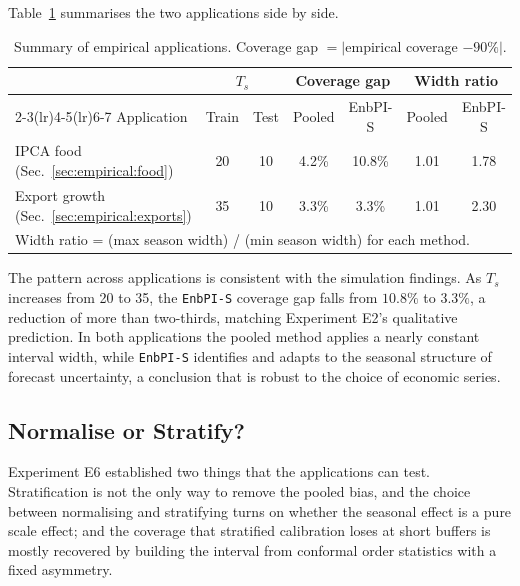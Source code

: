 Table~\ref{tab:empirical_comparison} summarises the two applications
side by side.

\begin{table}[ht]
\centering
\caption{Summary of empirical applications.
         Coverage gap $= |$empirical coverage $- 90\%|$.}
\label{tab:empirical_comparison}
\begin{tabular}{l cc cc cc}
\toprule
 & \multicolumn{2}{c}{$T_s$} &
   \multicolumn{2}{c}{Coverage gap} &
   \multicolumn{2}{c}{Width ratio} \\
\cmidrule(lr){2-3}\cmidrule(lr){4-5}\cmidrule(lr){6-7}
Application & Train & Test &
  Pooled & EnbPI-S & Pooled & EnbPI-S \\
\midrule
IPCA food (Sec.~\ref{sec:empirical:food})
  & 20 & 10 & 4.2\% & 10.8\% & 1.01 & 1.78 \\
Export growth (Sec.~\ref{sec:empirical:exports})
  & 35 & 10 & 3.3\% & 3.3\% & 1.01 & 2.30 \\
\bottomrule
\multicolumn{7}{l}{\footnotesize Width ratio = (max season width) /
  (min season width) for each method.}\\
\end{tabular}
\end{table}

The pattern across applications is consistent with the simulation
findings.  As $T_s$ increases from 20 to 35, the \texttt{EnbPI-S}
coverage gap falls from $10.8\%$ to $3.3\%$, a reduction of more than
two-thirds, matching Experiment E2's qualitative prediction.  In both
applications the pooled method applies a nearly constant interval
width, while \texttt{EnbPI-S} identifies and adapts to the seasonal
structure of forecast uncertainty, a conclusion that is robust to the
choice of economic series.

\subsection{Normalise or Stratify?}
\label{sec:empirical:choice}

Experiment E6 established two things that the applications can test.
Stratification is not the only way to remove the pooled bias, and the
choice between normalising and stratifying turns on whether the seasonal
effect is a pure scale effect; and the coverage that stratified
calibration loses at short buffers is mostly recovered by building the
interval from conformal order statistics with a fixed asymmetry.

